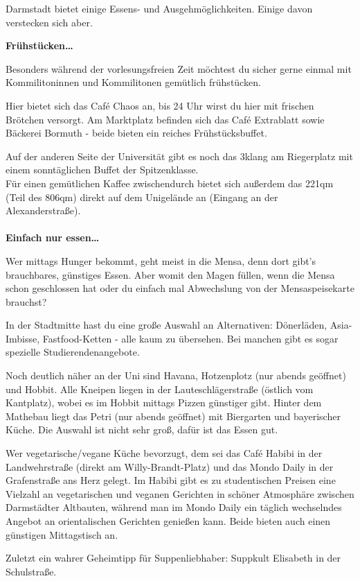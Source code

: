 {Darmstadt bietet einige Essens- und Ausgehmöglichkeiten. Einige davon verstecken sich aber.
}{
\textbf{Frühstücken…}

Besonders während der vorlesungsfreien Zeit möchtest du sicher gerne einmal mit Kommilitoninnen und Kommilitonen gemütlich frühstücken.

Hier bietet sich das Caf\'e Chaos an, bis 24 Uhr wirst du hier mit frischen Brötchen versorgt. Am Marktplatz befinden sich das Caf\'e Extrablatt sowie Bäckerei Bormuth - beide bieten ein reiches Frühstücksbuffet.

Auf der anderen Seite der Universität gibt es noch das 3klang am Riegerplatz mit einem sonntäglichen Buffet der Spitzenklasse.\\
Für einen gemütlichen Kaffee zwischendurch bietet sich außerdem das 221qm (Teil des 806qm) direkt auf dem Unigelände an (Eingang an der Alexanderstraße).
\\\\
\textbf{Einfach nur essen…}

Wer mittags Hunger bekommt, geht meist in die Mensa, denn dort gibt's brauchbares, günstiges Essen. Aber womit den Magen füllen, wenn die Mensa schon geschlossen hat oder du einfach mal Abwechslung von der Mensaspeisekarte brauchst?

In der Stadtmitte hast du eine große Auswahl an Alternativen: Dönerläden, Asia-Imbisse, Fastfood-Ketten - alle kaum zu übersehen. Bei manchen gibt es sogar spezielle Studierendenangebote.

Noch deutlich näher an der Uni sind Havana, Hotzenplotz (nur abends geöffnet) und Hobbit. Alle Kneipen liegen in der Lauteschlägerstraße (östlich vom Kantplatz), wobei es im Hobbit mittags Pizzen günstiger gibt. Hinter dem Mathebau liegt das Petri (nur abends geöffnet) mit Biergarten und bayerischer Küche. Die Auswahl ist nicht sehr groß, dafür ist das Essen gut.

Wer vegetarische/vegane Küche bevorzugt, dem sei das Café Habibi in der Landwehrstraße (direkt am Willy-Brandt-Platz) und das Mondo Daily in der Grafenstraße ans Herz gelegt. Im Habibi gibt es zu studentischen Preisen eine Vielzahl an vegetarischen und veganen Gerichten in schöner Atmosphäre zwischen Darmstädter Altbauten, während man im Mondo Daily ein täglich wechselndes Angebot an orientalischen Gerichten genießen kann.
Beide bieten auch einen günstigen Mittagstisch an.

Zuletzt ein wahrer Geheimtipp für Suppenliebhaber: Suppkult Elisabeth in der Schulstraße.\\

}
